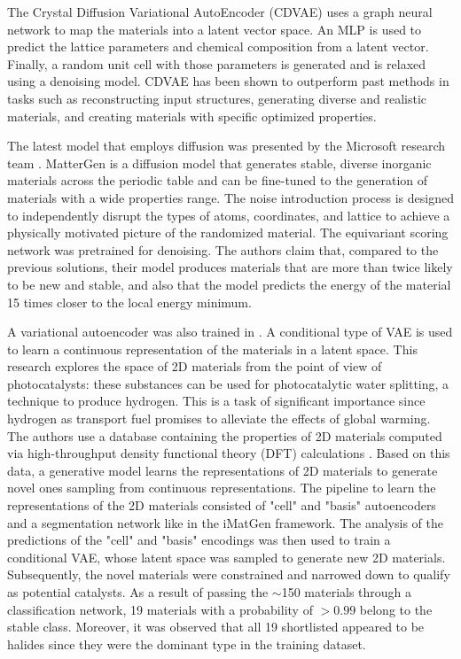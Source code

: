 The Crystal Diffusion Variational AutoEncoder (CDVAE) \cite{xie2021crystal} uses a graph neural network to map the materials into a latent vector space. An MLP is used to predict the lattice parameters and chemical composition from a latent vector. Finally, a random unit cell with those parameters is generated and is relaxed using a denoising model. CDVAE has been shown to outperform past methods in tasks such as reconstructing input structures, generating diverse and realistic materials, and creating materials with specific optimized properties.

The latest model that employs diffusion was presented by the Microsoft research team \cite{zeni2023mattergen}. MatterGen is a diffusion model that generates stable, diverse inorganic materials across the periodic table and can be fine-tuned to the generation of materials with a wide properties range. The noise introduction process is designed to independently disrupt the types of atoms, coordinates, and lattice to achieve a physically motivated picture of the randomized material. The equivariant scoring network was pretrained for denoising. The authors claim that, compared to the previous solutions, their model produces materials that are more than twice likely to be new and stable, and also that the model predicts the energy of the material 15 times closer to the local energy minimum.

A variational autoencoder was also trained in \cite{agarwalDataDrivenDiscovery2D2021a}. A conditional type of VAE is used to learn a continuous representation of the materials in a latent space. This research explores the space of 2D materials from the point of view of photocatalysts: these substances can be used for photocatalytic water splitting, a technique to produce hydrogen. This is a task of significant importance since hydrogen as transport fuel promises to alleviate the effects of global warming. 
The authors use a database containing the properties of 2D materials computed via high-throughput density functional theory (DFT) calculations \cite{jainCommentaryMaterialsProject2013}. Based on this data, a generative model learns the representations of 2D materials to generate novel ones sampling from continuous representations. The pipeline to learn the representations of the 2D materials consisted of "cell" and "basis" autoencoders and a segmentation network like in the iMatGen framework. The analysis of the predictions of the "cell" and "basis" encodings was then used to train a conditional VAE, whose latent space was sampled to generate new 2D materials. Subsequently, the novel materials were constrained and narrowed down to qualify as potential catalysts. As a result of passing the $\sim$150 materials through a classification network, 19 materials with a probability of $>0.99$ belong to the stable class. Moreover, it was observed that all 19 shortlisted appeared to be halides since they were the dominant type in the training dataset.



